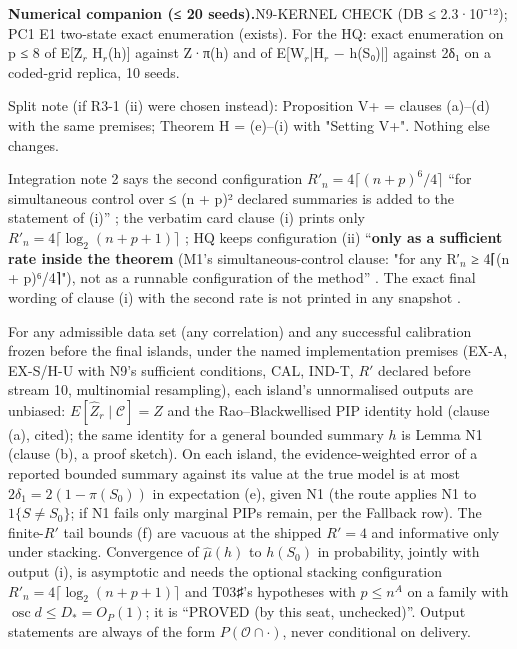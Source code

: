 {\par\smallskip\noindent\textbf{Numerical companion (≤ 20 seeds).}\enspace N9-KERNEL CHECK (DB ≤ 2.3·10⁻¹²); PC1 E1 two-state exact enumeration (exists). For the HQ: exact enumeration on p ≤ 8 of E[Ẑ$_{r}$ H$_{r}$(h)] against Z·π(h) and of E[W$_{r}$|H$_{r}$ − h(S₀)|] against 2δ₁ on a coded-grid replica, 10 seeds.
\par\noindent Split note (if R3-1 (ii) were chosen instead): Proposition V+ = clauses (a)–(d) with the same premises; Theorem H = (e)–(i) with "Setting V+". Nothing else changes.
}

\begin{uncertain}
Integration note 2 says the second configuration $R'_n=4\lceil(n+p)^{6}/4\rceil$ ``for simultaneous control over ≤ (n + p)² declared summaries is added to the statement of (i)'' ; the verbatim card clause (i) prints only $R'_n=4\lceil\log_2(n+p+1)\rceil$ ; HQ keeps configuration (ii) ``\textbf{only as a sufficient rate inside the theorem} (M1's simultaneous-control clause: "for any R′$_{n}$ ≥ 4⌈(n + p)⁶/4⌉"), not as a runnable configuration of the method'' . The exact final wording of clause (i) with the second rate is not printed in any snapshot .
\end{uncertain}

\begin{plain}
For any admissible data set (any correlation) and any successful calibration frozen before the final islands, under the named implementation premises (EX-A, EX-S/H-U with N9's sufficient conditions, CAL, IND-T, $R'$ declared before stream 10, multinomial resampling), each island's unnormalised outputs are unbiased: $E[\hat{Z}_r\mid\mathcal{C}]=Z$ and the Rao–Blackwellised PIP identity hold (clause (a), cited); the same identity for a general bounded summary $h$ is Lemma N1 (clause (b), a proof sketch). On each island, the evidence-weighted error of a reported bounded summary against its value at the true model is at most $2\delta_1=2(1-\pi(S_0))$ in expectation (e), given N1 (the route applies N1 to $1\{S\ne S_0\}$; if N1 fails only marginal PIPs remain, per the Fallback row). The finite-$R'$ tail bounds (f) are vacuous at the shipped $R'=4$ and informative only under stacking. Convergence of $\hat{\mu}(h)$ to $h(S_0)$ in probability, jointly with output (i), is asymptotic and needs the optional stacking configuration $R'_n=4\lceil\log_2(n+p+1)\rceil$ and T03♯'s hypotheses with $p\le n^A$ on a family with $\operatorname{osc}d\le D_{*}=O_P(1)$; it is ``PROVED (by this seat, unchecked)''. Output statements are always of the form $P(\mathcal{O}\cap\cdot)$, never conditional on delivery.
\end{plain}

